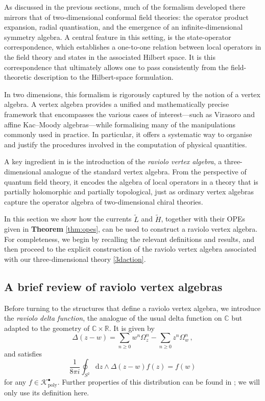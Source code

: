 \documentclass[11pt]{amsart}
\newcommand{\R}{{\mathbb R}}
\newcommand{\C}{{\mathbb C}}
\newcommand{\tL}{{\tilde L}}
\newcommand{\tH}{{\tilde H}}
\numberwithin{equation}{section}
\numberwithin{figure}{section}
\numberwithin{table}{section}
\renewcommand{\d}{\mathrm{d}}
\theoremstyle{thm}
\numberwithin{equation}{subsection}
\theoremstyle{definition}
\theoremstyle{rem}
\begin{document}
As discussed in the previous sections, much of the formalism developed there mirrors that of two-dimensional conformal field theories: the operator product expansion, radial quantisation, and the emergence of an infinite-dimensional symmetry algebra. A central feature in this setting, is the state-operator correspondence, which establishes a one-to-one relation between local operators in the field theory and states in the associated Hilbert space. It is this correspondence that ultimately allows one to pass consistently from the field-theoretic description to the Hilbert-space formulation.



In two dimensions, this formalism is rigorously captured by the notion of a vertex algebra. A vertex algebra provides a unified and mathematically precise framework that encompasses the various cases of interest—such as Virasoro and affine Kac–Moody algebras—while formalising many of the manipulations commonly used in practice. In particular, it offers a systematic way to organise and justify the procedures involved in the computation of physical quantities.

A key ingredient in \cite{Garner:2023zqn} is the introduction of the \textit{raviolo vertex algebra}, a three-dimensional analogue of the standard vertex algebra. From the perspective of quantum field theory, it encodes the algebra of local operators in a theory that is partially holomorphic and partially topological, just as ordinary vertex algebras capture the operator algebra of two-dimensional chiral theories.

In this section we show how the currents $\tL$ and $\tH$, together with their OPEs given in \textbf{Theorem} \ref{thm:opes}, can be used to construct a raviolo vertex algebra. For completeness, we begin by recalling the relevant definitions and results, and then proceed to the explicit construction of the raviolo vertex algebra associated with our three-dimensional theory \eqref{3daction}.

\subsection{A brief review of raviolo vertex algebras}


Before turning to the structures that define a raviolo vertex algebra, we introduce the \emph{raviolo delta function}, the analogue of the usual delta function on $\C$ but adapted to the geometry of $\C\times\R$. It is given by \cite{Garner:2023zqn}
\begin{equation}
\label{ec:deltafunction}
    \Delta(z-w) = \sum_{n\geq 0}w^n\Omega_z^n-\sum_{n\geq 0} z^n\Omega_w ^n\,, 
\end{equation}
and satisfies 
\begin{equation}
    \frac{1}{8\pi i}\oint_{S^2}\d z \wedge \Delta(z-w)f(z) = f(w)
\end{equation}
for any $f\in \mathcal{K}_{\mathrm{poly}}^\bullet$. Further properties of this distribution can be found in \cite{Garner:2023zqn}; we will only use its definition here.
\end{document}
